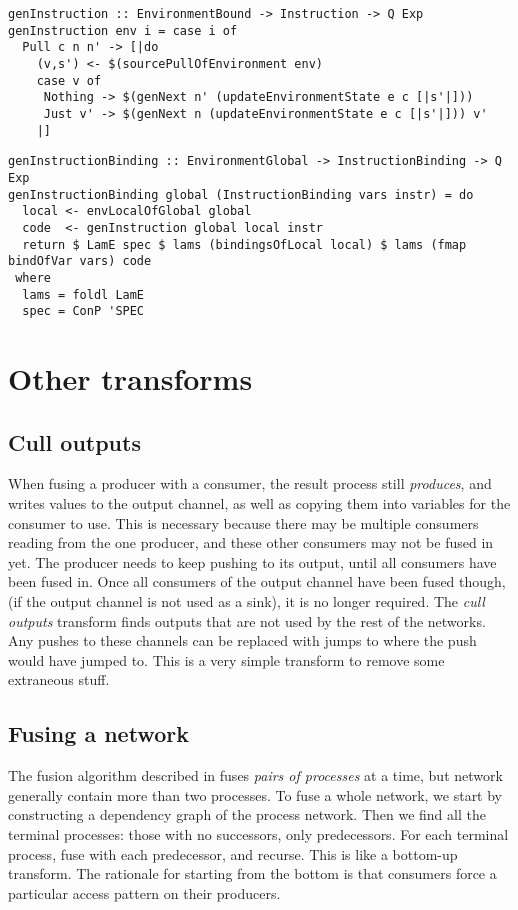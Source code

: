 \begin{lstlisting}
genInstruction :: EnvironmentBound -> Instruction -> Q Exp
genInstruction env i = case i of
  Pull c n n' -> [|do
    (v,s') <- $(sourcePullOfEnvironment env)
    case v of
     Nothing -> $(genNext n' (updateEnvironmentState e c [|s'|]))
     Just v' -> $(genNext n (updateEnvironmentState e c [|s'|])) v'
    |]
\end{lstlisting}

\begin{lstlisting}
genInstructionBinding :: EnvironmentGlobal -> InstructionBinding -> Q Exp
genInstructionBinding global (InstructionBinding vars instr) = do
  local <- envLocalOfGlobal global
  code  <- genInstruction global local instr
  return $ LamE spec $ lams (bindingsOfLocal local) $ lams (fmap bindOfVar vars) code
 where
  lams = foldl LamE
  spec = ConP 'SPEC
\end{lstlisting}

\section{Other transforms}
\subsection{Cull outputs}
When fusing a producer with a consumer, the result process still \emph{produces}, and writes values to the output channel, as well as copying them into variables for the consumer to use.
This is necessary because there may be multiple consumers reading from the one producer, and these other consumers may not be fused in yet.
The producer needs to keep pushing to its output, until all consumers have been fused in.
Once all consumers of the output channel have been fused though, (if the output channel is not used as a sink), it is no longer required.
The \emph{cull outputs} transform finds outputs that are not used by the rest of the networks.
Any pushes to these channels can be replaced with jumps to where the push would have jumped to.
This is a very simple transform to remove some extraneous stuff.


\subsection{Fusing a network}
The fusion algorithm described in  fuses \emph{pairs of processes} at a time, but network generally contain more than two processes.
To fuse a whole network, we start by constructing a dependency graph of the process network.
Then we find all the terminal processes: those with no successors, only predecessors.
For each terminal process, fuse with each predecessor, and recurse.
This is like a bottom-up transform.
The rationale for starting from the bottom is that consumers force a particular access pattern on their producers.

